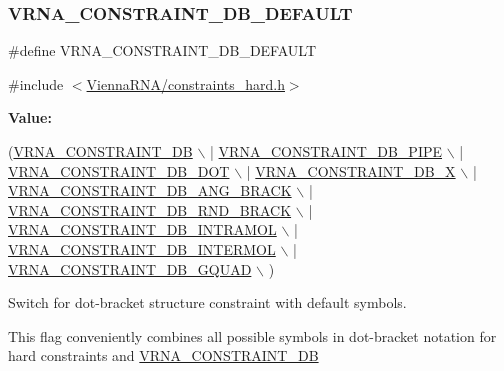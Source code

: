 \subsubsection{\texorpdfstring{V\+R\+N\+A\+\_\+\+C\+O\+N\+S\+T\+R\+A\+I\+N\+T\+\_\+\+D\+B\+\_\+\+D\+E\+F\+A\+U\+LT}{VRNA\_CONSTRAINT\_DB\_DEFAULT}}
{\footnotesize\ttfamily \#define V\+R\+N\+A\+\_\+\+C\+O\+N\+S\+T\+R\+A\+I\+N\+T\+\_\+\+D\+B\+\_\+\+D\+E\+F\+A\+U\+LT}



{\ttfamily \#include $<$\mbox{\hyperlink{constraints__hard_8h}{Vienna\+R\+N\+A/constraints\+\_\+hard.\+h}}$>$}

{\bfseries Value\+:}
\begin{DoxyCode}
(\mbox{\hyperlink{group__hard__constraints_ga4bfc2f15c4f261c62a11af9d2aa80c90}{VRNA\_CONSTRAINT\_DB}} \(\backslash\)
   | \mbox{\hyperlink{group__hard__constraints_ga13053547a2de5532b64b64d35e097ae1}{VRNA\_CONSTRAINT\_DB\_PIPE}} \(\backslash\)
   | \mbox{\hyperlink{group__hard__constraints_ga369bea82eae75fbe626f409fa425747e}{VRNA\_CONSTRAINT\_DB\_DOT}} \(\backslash\)
   | \mbox{\hyperlink{group__hard__constraints_ga7283bbe0f8954f7b030ecc3f2d1932b2}{VRNA\_CONSTRAINT\_DB\_X}} \(\backslash\)
   | \mbox{\hyperlink{constraints__hard_8h_ad54c1315a47d55653dcaa5de6e544b77}{VRNA\_CONSTRAINT\_DB\_ANG\_BRACK}} \(\backslash\)
   | \mbox{\hyperlink{group__hard__constraints_gac17b034852c914bc5879954c65d7e74b}{VRNA\_CONSTRAINT\_DB\_RND\_BRACK}} \(\backslash\)
   | \mbox{\hyperlink{group__hard__constraints_ga5c17253f5a39d1d49b0fb11f5196982a}{VRNA\_CONSTRAINT\_DB\_INTRAMOL}} \(\backslash\)
   | \mbox{\hyperlink{group__hard__constraints_ga31d0ebb9755ca8a4acafc14f00ca755d}{VRNA\_CONSTRAINT\_DB\_INTERMOL}} \(\backslash\)
   | \mbox{\hyperlink{group__hard__constraints_ga75cfab03cdc97c95b3ce8bb29f52b08e}{VRNA\_CONSTRAINT\_DB\_GQUAD}} \(\backslash\)
  )
\end{DoxyCode}


Switch for dot-\/bracket structure constraint with default symbols. 

This flag conveniently combines all possible symbols in dot-\/bracket notation for hard constraints and \mbox{\hyperlink{group__hard__constraints_ga4bfc2f15c4f261c62a11af9d2aa80c90}{V\+R\+N\+A\+\_\+\+C\+O\+N\+S\+T\+R\+A\+I\+N\+T\+\_\+\+DB}}

